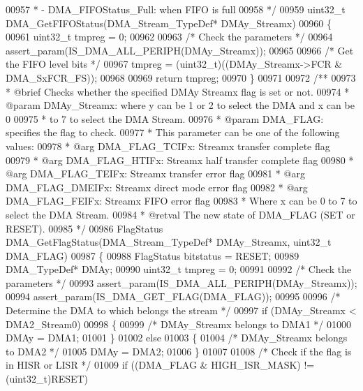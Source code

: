 \begin{DoxyCode}
00957 \textcolor{comment}{  *           - DMA\_FIFOStatus\_Full: when FIFO is full}
00958 \textcolor{comment}{  */}
00959 uint32\_t DMA_GetFIFOStatus(DMA\_Stream\_TypeDef* DMAy\_Streamx)
00960 \{
00961   uint32\_t tmpreg = 0;
00962 
00963   \textcolor{comment}{/* Check the parameters */}
00964   assert_param(IS\_DMA\_ALL\_PERIPH(DMAy\_Streamx));
00965 
00966   \textcolor{comment}{/* Get the FIFO level bits */}
00967   tmpreg = (uint32\_t)((DMAy\_Streamx->FCR & DMA_SxFCR_FS));
00968 
00969   \textcolor{keywordflow}{return} tmpreg;
00970 \}
00971 
00972 \textcolor{comment}{/**}
00973 \textcolor{comment}{  * @brief  Checks whether the specified DMAy Streamx flag is set or not.}
00974 \textcolor{comment}{  * @param  DMAy\_Streamx: where y can be 1 or 2 to select the DMA and x can be 0}
00975 \textcolor{comment}{  *          to 7 to select the DMA Stream.}
00976 \textcolor{comment}{  * @param  DMA\_FLAG: specifies the flag to check.}
00977 \textcolor{comment}{  *          This parameter can be one of the following values:}
00978 \textcolor{comment}{  *            @arg DMA\_FLAG\_TCIFx:  Streamx transfer complete flag}
00979 \textcolor{comment}{  *            @arg DMA\_FLAG\_HTIFx:  Streamx half transfer complete flag}
00980 \textcolor{comment}{  *            @arg DMA\_FLAG\_TEIFx:  Streamx transfer error flag}
00981 \textcolor{comment}{  *            @arg DMA\_FLAG\_DMEIFx: Streamx direct mode error flag}
00982 \textcolor{comment}{  *            @arg DMA\_FLAG\_FEIFx:  Streamx FIFO error flag}
00983 \textcolor{comment}{  *         Where x can be 0 to 7 to select the DMA Stream.}
00984 \textcolor{comment}{  * @retval The new state of DMA\_FLAG (SET or RESET).}
00985 \textcolor{comment}{  */}
00986 FlagStatus DMA_GetFlagStatus(DMA\_Stream\_TypeDef* DMAy\_Streamx, uint32\_t DMA\_FLAG)
00987 \{
00988   FlagStatus bitstatus = RESET;
00989   DMA\_TypeDef* DMAy;
00990   uint32\_t tmpreg = 0;
00991 
00992   \textcolor{comment}{/* Check the parameters */}
00993   assert_param(IS\_DMA\_ALL\_PERIPH(DMAy\_Streamx));
00994   assert_param(IS\_DMA\_GET\_FLAG(DMA\_FLAG));
00995 
00996   \textcolor{comment}{/* Determine the DMA to which belongs the stream */}
00997   \textcolor{keywordflow}{if} (DMAy\_Streamx < DMA2_Stream0)
00998   \{
00999     \textcolor{comment}{/* DMAy\_Streamx belongs to DMA1 */}
01000     DMAy = DMA1;
01001   \}
01002   \textcolor{keywordflow}{else}
01003   \{
01004     \textcolor{comment}{/* DMAy\_Streamx belongs to DMA2 */}
01005     DMAy = DMA2;
01006   \}
01007 
01008   \textcolor{comment}{/* Check if the flag is in HISR or LISR */}
01009   \textcolor{keywordflow}{if} ((DMA\_FLAG & HIGH_ISR_MASK) != (uint32\_t)RESET)

\end{DoxyCode}
